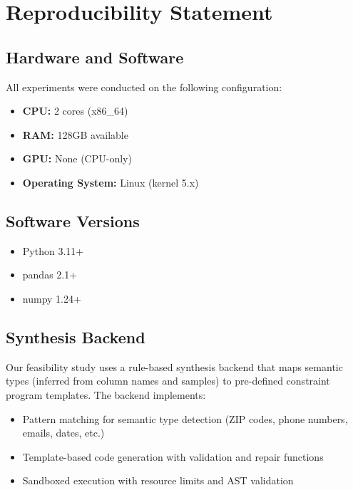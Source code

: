 \documentclass{article}
\begin{document}
\newpage
\appendix

\section{Reproducibility Statement}
\label{sec:reproducibility}

\subsection{Hardware and Software}

All experiments were conducted on the following configuration:
\begin{itemize}
    \item \textbf{CPU:} 2 cores (x86\_64)
    \item \textbf{RAM:} 128GB available
    \item \textbf{GPU:} None (CPU-only)
    \item \textbf{Operating System:} Linux (kernel 5.x)
\end{itemize}

\subsection{Software Versions}

\begin{itemize}
    \item Python 3.11+
    \item pandas 2.1+
    \item numpy 1.24+
\end{itemize}

\subsection{Synthesis Backend}

Our feasibility study uses a rule-based synthesis backend that maps semantic types (inferred from column names and samples) to pre-defined constraint program templates. The backend implements:

\begin{itemize}
    \item Pattern matching for semantic type detection (ZIP codes, phone numbers, emails, dates, etc.)
    \item Template-based code generation with validation and repair functions
    \item Sandboxed execution with resource limits and AST validation
\end{itemize}
\end{document}
